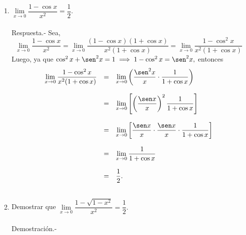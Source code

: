 \begin{enumerate}[\bfseries 1.]
    \item $\lim\limits_{x\to 0}\dfrac{1-\cos x}{x^2}=\dfrac{1}{2}.$\\\\
	Respuesta.-\; Sea,
	$$\lim_{x\to 0}\dfrac{1-\cos x}{x^2}=\lim_{x\to 0} \dfrac{(1-\cos x)(1+\cos x)}{x^2(1+\cos x)}=\lim_{x\to 0}\dfrac{1-\cos^2 x}{x^2(1+\cos x)}$$
	Luego, ya que $\cos^2x+\sen^2 x = 1 \; \Longrightarrow \; 1-\cos^2x = \sen^2x,$ entonces
	$$\begin{array}{rcl}
	    \lim\limits_{x\to 0}\dfrac{1-\cos^2 x}{x^2(1+\cos x)}&=&\lim\limits_{x\to 0}\left(\dfrac{\sen^2 x}{x}\cdot \dfrac{1}{1+\cos x}\right)\\\\
								 &=&\lim\limits_{x\to 0}\left[\left(\dfrac{\sen x}{x}\right)^2 \dfrac{1}{1+\cos x}\right]\\\\
								 &=&\lim\limits_{x\to 0}\left[\dfrac{\sen x}{x}\cdot \dfrac{\sen x}{x}\cdot \dfrac{1}{1+\cos x}\right]\\\\
								 &=&\lim\limits_{x\to 0}\dfrac{1}{1+\cos x}\\\\
								 &=&\dfrac{1}{2}.\\\\


	\end{array}$$

    \item Demostrar que $\lim\limits_{x\to 0}\dfrac{1-\sqrt{1-x^2}}{x^2}=\dfrac{1}{2}.$\\\\
	Demostración.-\; 


\end{enumerate}

